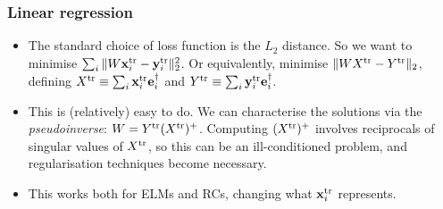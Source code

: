 \documentclass{beamer}
\begin{document}
\begin{frame}
\frametitle{Linear regression}

\begin{itemize}
    \item The standard choice of loss function is the $L_2$ distance. So we want to minimise $\sum_i \|W \mathbf x_i^{\rm tr}-\mathbf y_i^{\rm tr}\|_2^2$. Or equivalently, minimise $\|WX^{\rm tr}-Y^{\rm tr}\|_2$, defining $X^{\rm tr}\equiv \sum_i \mathbf x_i^{\rm tr} \mathbf e_i^\dagger$ and $Y^{\rm tr}\equiv \sum_i \mathbf y_i^{\rm tr} \mathbf e_i^\dagger$.
    \item This is (relatively) easy to do. We can characterise the solutions via the \textit{pseudoinverse}: $W = Y^{\rm tr} (X^{\rm tr})^+$. Computing $(X^{\rm tr})^+$ involves reciprocals of singular values of $X^{\rm tr}$, so this can be an ill-conditioned problem, and regularisation techniques become necessary.
    \item This works both for ELMs and RCs, changing what $\mathbf x_i^{\rm tr}$ represents.
\end{itemize}

\end{frame}
\end{document}
